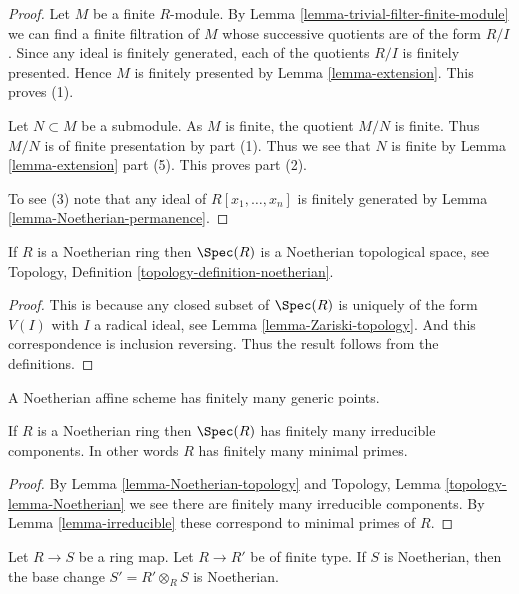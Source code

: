 \begin{proof}
Let $M$ be a finite $R$-module. By
Lemma \ref{lemma-trivial-filter-finite-module}
we can find a finite filtration of $M$ whose successive quotients are
of the form $R/I$. Since any ideal is finitely generated, each of
the quotients $R/I$ is finitely presented. Hence $M$ is finitely
presented by
Lemma \ref{lemma-extension}.
This proves (1).

\medskip\noindent
Let $N \subset M$ be a submodule. As $M$ is finite, the quotient
$M/N$ is finite. Thus $M/N$ is of finite presentation by part (1).
Thus we see that $N$ is finite by Lemma \ref{lemma-extension} part (5).
This proves part (2).

\medskip\noindent
To see (3) note that any ideal of
$R[x_1, \ldots, x_n]$ is finitely generated by
Lemma \ref{lemma-Noetherian-permanence}.
\end{proof}

\begin{lemma}
\label{lemma-Noetherian-topology}
If $R$ is a Noetherian ring then $\Spec(R)$
is a Noetherian topological space, see Topology,
Definition \ref{topology-definition-noetherian}.
\end{lemma}

\begin{proof}
This is because any closed subset of $\Spec(R)$
is uniquely of the form $V(I)$ with $I$ a radical ideal,
see Lemma \ref{lemma-Zariski-topology}.
And this correspondence is inclusion reversing.
Thus the result follows from the definitions.
\end{proof}

\begin{lemma}
\label{lemma-Noetherian-irreducible-components}
\begin{slogan}
A Noetherian affine scheme has finitely many generic points.
\end{slogan}
If $R$ is a Noetherian ring then $\Spec(R)$
has finitely many irreducible components. In other words
$R$ has finitely many minimal primes.
\end{lemma}

\begin{proof}
By Lemma \ref{lemma-Noetherian-topology} and
Topology, Lemma \ref{topology-lemma-Noetherian}
we see there are finitely many irreducible components.
By Lemma \ref{lemma-irreducible} these correspond to
minimal primes of $R$.
\end{proof}

\begin{lemma}
\label{lemma-Noetherian-base-change-finite-type}
Let $R \to S$ be a ring map. Let $R \to R'$ be of finite type.
If $S$ is Noetherian, then the base change $S' = R' \otimes_R S$
is Noetherian.
\end{lemma}

